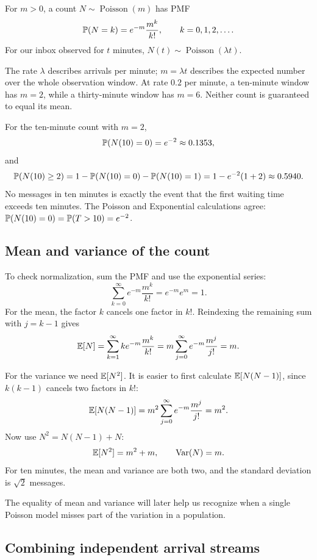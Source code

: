\begin{definition}
For \(m>0\), a count \(N\sim\operatorname{Poisson}(m)\) has PMF
\[
  \mathbb{P}(N=k)=e^{-m}\frac{m^k}{k!},
  \qquad k=0,1,2,\ldots.
\]
For our inbox observed for \(t\) minutes,
\(N(t)\sim\operatorname{Poisson}(\lambda t)\).
\end{definition}

The rate \(\lambda\) describes arrivals per minute; \(m=\lambda t\)
describes the expected number over the whole observation window.
At rate \(0.2\) per minute, a ten-minute window has \(m=2\), while a
thirty-minute window has \(m=6\).
Neither count is guaranteed to equal its mean.

\begin{example}
For the ten-minute count with \(m=2\),
\[
  \mathbb{P}(N(10)=0)=e^{-2}\approx0.1353,
\]
and
\[
  \mathbb{P}(N(10)\ge2)
  =1-\mathbb{P}(N(10)=0)-\mathbb{P}(N(10)=1)
  =1-e^{-2}(1+2)\approx0.5940.
\]
No messages in ten minutes is exactly the event that the first waiting
time exceeds ten minutes. The Poisson and Exponential calculations agree:
\(\mathbb{P}(N(10)=0)=\mathbb{P}(T>10)=e^{-2}\).
\end{example}

\subsection{Mean and variance of the count}

To check normalization, sum the PMF and use the exponential series:
\[
  \sum_{k=0}^\infty e^{-m}\frac{m^k}{k!}=e^{-m}e^m=1.
\]
For the mean, the factor \(k\) cancels one factor in \(k!\).
Reindexing the remaining sum with \(j=k-1\) gives
\[
  \mathbb{E}[N]
  =\sum_{k=1}^\infty k e^{-m}\frac{m^k}{k!}
  =m\sum_{j=0}^\infty e^{-m}\frac{m^j}{j!}=m.
\]

For the variance we need \(\mathbb{E}[N^2]\). It is easier to first calculate
\(\mathbb{E}[N(N-1)]\), since \(k(k-1)\) cancels two factors in \(k!\):
\[
  \mathbb{E}[N(N-1)]
  =m^2\sum_{j=0}^\infty e^{-m}\frac{m^j}{j!}=m^2.
\]
Now use \(N^2=N(N-1)+N\):
\[
  \mathbb{E}[N^2]=m^2+m,\qquad \operatorname{Var}(N)=m.
\]
For ten minutes, the mean and variance are both two, and the standard
deviation is \(\sqrt2\) messages.

The equality of mean and variance will later help us recognize when a
single Poisson model misses part of the variation in a population.

\subsection{Combining independent arrival streams}

